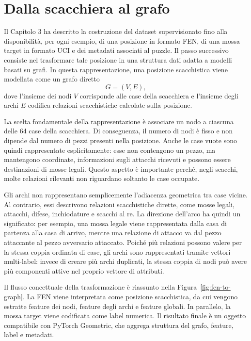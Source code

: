 \label{chap:graph-representation}

\section{Dalla scacchiera al grafo}

Il Capitolo 3 ha descritto la costruzione del dataset supervisionato fino alla disponibilit\`a, per ogni esempio, di una posizione in formato FEN, di una mossa target in formato UCI e dei metadati associati al puzzle. Il passo successivo consiste nel trasformare tale posizione in una struttura dati adatta a modelli basati su grafi. In questa rappresentazione, una posizione scacchistica viene modellata come un grafo diretto
\[
    G = (V, E),
\]
dove l'insieme dei nodi \(V\) corrisponde alle case della scacchiera e l'insieme degli archi \(E\) codifica relazioni scacchistiche calcolate sulla posizione.

La scelta fondamentale della rappresentazione \`e associare un nodo a ciascuna delle 64 case della scacchiera. Di conseguenza, il numero di nodi \`e fisso e non dipende dal numero di pezzi presenti nella posizione. Anche le case vuote sono quindi rappresentate esplicitamente: esse non contengono un pezzo, ma mantengono coordinate, informazioni sugli attacchi ricevuti e possono essere destinazioni di mosse legali. Questo aspetto \`e importante perch\'e, negli scacchi, molte relazioni rilevanti non riguardano soltanto le case occupate.

Gli archi non rappresentano semplicemente l'adiacenza geometrica tra case vicine. Al contrario, essi descrivono relazioni scacchistiche dirette, come mosse legali, attacchi, difese, inchiodature e scacchi al re. La direzione dell'arco ha quindi un significato: per esempio, una mossa legale viene rappresentata dalla casa di partenza alla casa di arrivo, mentre una relazione di attacco va dal pezzo attaccante al pezzo avversario attaccato. Poich\'e pi\`u relazioni possono valere per la stessa coppia ordinata di case, gli archi sono rappresentati tramite vettori multi-label: invece di creare pi\`u archi duplicati, la stessa coppia di nodi pu\`o avere pi\`u componenti attive nel proprio vettore di attributi.

Il flusso concettuale della trasformazione \`e riassunto nella Figura~\ref{fig:fen-to-graph}. La FEN viene interpretata come posizione scacchistica, da cui vengono estratte feature dei nodi, feature degli archi e feature globali. In parallelo, la mossa target viene codificata come label numerica. Il risultato finale \`e un oggetto compatibile con PyTorch Geometric, che aggrega struttura del grafo, feature, label e metadati.

